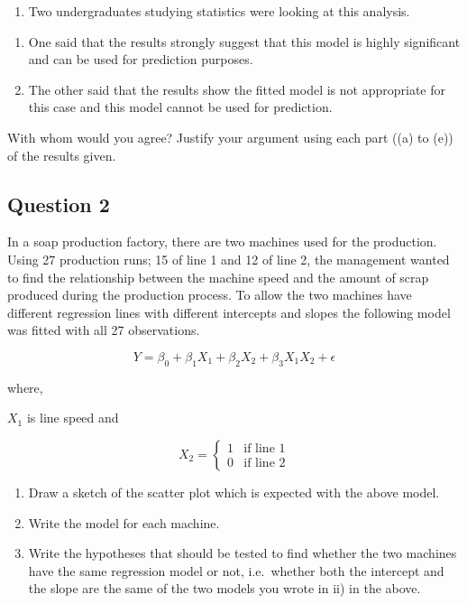 \documentclass[]{article}
\providecommand{\tightlist}{%
  \setlength{\itemsep}{0pt}\setlength{\parskip}{0pt}}
\begin{document}
\begin{enumerate}
\def\labelenumi{\roman{enumi})}
\setcounter{enumi}{1}
\tightlist
\item
  Two undergraduates studying statistics were looking at this analysis.
\end{enumerate}

\begin{enumerate}
\def\labelenumi{(\Alph{enumi})}
\item
  One said that the results strongly suggest that this model is highly
  significant and can be used for prediction purposes.
\item
  The other said that the results show the fitted model is not
  appropriate for this case and this model cannot be used for
  prediction.
\end{enumerate}

With whom would you agree? Justify your argument using each part ((a) to
(e)) of the results given.

\hypertarget{question-2}{%
\subsection{Question 2}\label{question-2}}

In a soap production factory, there are two machines used for the
production. Using 27 production runs; 15 of line 1 and 12 of line 2, the
management wanted to find the relationship between the machine speed and
the amount of scrap produced during the production process. To allow the
two machines have different regression lines with different intercepts
and slopes the following model was fitted with all 27 observations.

\[Y = \beta_0 + \beta_1 X_1 + \beta_2 X_2 + \beta_3 X_1 X_2 + \epsilon\]

where,

\(X_1\) is line speed and

\begin{equation}
  X_{2} =
  \begin{cases}
    1 & \text{if line 1} \\
    0 & \text{if line 2}
  \end{cases}
\end{equation}

\begin{enumerate}
\def\labelenumi{\roman{enumi})}
\item
  Draw a sketch of the scatter plot which is expected with the above
  model.
\item
  Write the model for each machine.
\item
  Write the hypotheses that should be tested to find whether the two
  machines have the same regression model or not, i.e.~whether both the
  intercept and the slope are the same of the two models you wrote in
  ii) in the above.
\end{enumerate}
\end{document}
